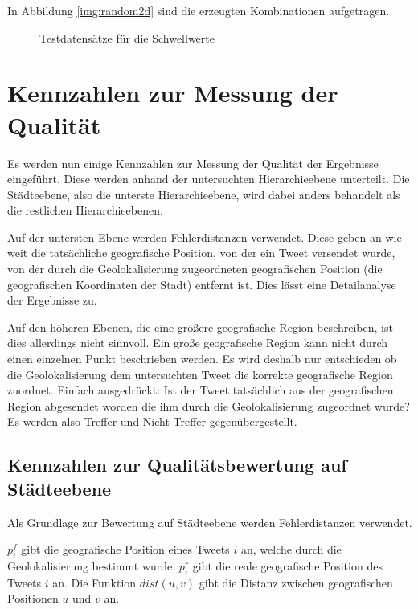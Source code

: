 			In Abbildung \ref{img:random2d} sind die erzeugten Kombinationen aufgetragen.

			\begin{figure}[!ht]
				\centering
				\caption{Testdatensätze für die Schwellwerte}
				\label{img:relHaufBsp}
			\end{figure}

	\section{Kennzahlen zur Messung der Qualität} \label{sec:Kennzahlen} 

		Es werden nun einige Kennzahlen zur Messung der Qualität der Ergebnisse eingeführt.
		Diese werden anhand der untersuchten Hierarchieebene unterteilt.
		Die Städteebene, also die unterste Hierarchieebene, wird dabei anders behandelt als die restlichen Hierarchieebenen.

		Auf der untersten Ebene werden Fehlerdistanzen verwendet.
		Diese geben an wie weit die tatsächliche geografische Position, von der ein Tweet versendet wurde, von der durch die Geolokalisierung zugeordneten geografischen Position (die geografischen Koordinaten der Stadt) entfernt ist.
		Dies lässt eine Detailanalyse der Ergebnisse zu.

		Auf den höheren Ebenen, die eine größere geografische Region beschreiben, ist dies allerdings nicht sinnvoll.
		Ein große geografische Region kann nicht durch einen einzelnen Punkt beschrieben werden. 
		Es wird deshalb nur entschieden ob die Geolokalisierung dem untersuchten Tweet die korrekte geografische Region zuordnet. 
		Einfach ausgedrückt: Ist der Tweet tatsächlich aus der geografischen Region abgesendet worden die ihm durch die Geolokalisierung zugeordnet wurde?
		Es werden also Treffer und Nicht-Treffer gegenübergestellt. 
		
		\subsection{Kennzahlen zur Qualitätsbewertung auf Städteebene}

			Als Grundlage zur Bewertung auf Städteebene werden Fehlerdistanzen verwendet.

			$p^f_{i}$ gibt die geografische Position eines Tweets $i$ an, welche durch die Geolokalisierung bestimmt wurde.
			$p^r_{i}$ gibt die reale geografische Position des Tweets $i$ an. 
			Die Funktion $dist(u,v)$ gibt die Distanz zwischen geografischen Positionen $u$ und $v$ an.

